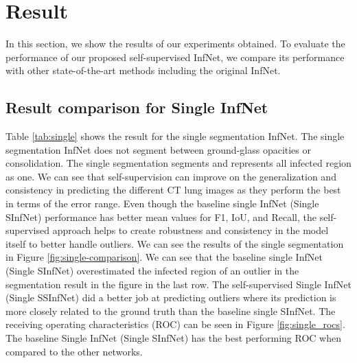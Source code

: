 
\section{Result}
In this section, we show the results of our experiments obtained. To evaluate the performance of our proposed self-supervised InfNet, we compare its performance with other state-of-the-art methods including the original InfNet.

\subsection{Result comparison for Single InfNet}
Table \ref{tab:single} shows the result for the single segmentation InfNet. The single segmentation InfNet does not segment between ground-glass opacities or consolidation. The single segmentation segments and represents all infected region as one. We can see that self-supervision can improve on the generalization and consistency in predicting the different CT lung images as they perform the best in terms of the error range. Even though the baseline single InfNet (Single SInfNet) performance has better mean values for F1, IoU, and Recall, the self-supervised approach helps to create robustness and consistency in the model itself to better handle outliers. We can see the results of the single segmentation in Figure \ref{fig:single-comparison}. We can see that the baseline single InfNet (Single SInfNet) overestimated the infected region of an outlier in the segmentation result in the figure in the last row. The self-supervised Single InfNet (Single SSInfNet) did a better job at predicting outliers where its prediction is more closely related to the ground truth than the baseline single SInfNet. The receiving operating characteristics (ROC) can be seen in Figure \ref{fig:single_rocs}. The baseline Single InfNet (Single SInfNet) has the best performing ROC when compared to the other networks.
 
